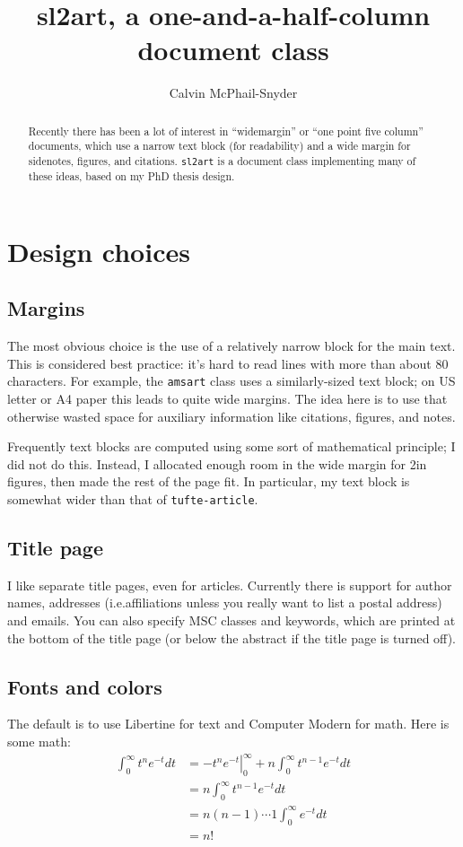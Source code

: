 \documentclass{sl2art}
\title{sl2art, a one-and-a-half-column document class}
\author{Calvin McPhail-Snyder}
\begin{document}
\begin{abstract}
  Recently there has been a lot of interest in ``widemargin'' or ``one point five column'' documents, which use a narrow text block (for readability) and a wide margin for sidenotes, figures, and citations.
\texttt{sl2art} is a document class implementing many of these ideas, based on my PhD thesis design.
\end{abstract}

\maketitle
\tableofcontents

\section{Design choices}

\subsection{Margins}
The most obvious choice is the use of a relatively narrow block for the main text.
This is considered best practice: it's hard to read lines with more than about 80 characters.
For example, the \texttt{amsart} class uses a similarly-sized text block; on US letter or A4 paper this leads to quite wide margins.
The idea here is to use that otherwise wasted space for auxiliary information like citations, figures, and notes.

Frequently text blocks are computed using some sort of mathematical principle; I did not do this.
Instead, I allocated enough room in the wide margin for 2in figures, then made the rest of the page fit.
In particular, my text block is somewhat wider than that of \texttt{tufte-article}.

\subsection{Title page}
I like separate title pages, even for articles.
Currently there is support for author names, addresses (i.e.\@ affiliations unless you really want to list a postal address) and emails.
You can also specify MSC classes and keywords, which are printed at the bottom of the title page (or below the abstract if the title page is turned off).

\subsection{Fonts and colors}
The default is to use Libertine for text and Computer Modern for math.
Here is some math:
\begin{align*}
  \int_{0}^{\infty} t^{n} e^{-t} dt
  &=
  \left.- t^{n} e^{-t} \right|_{0}^{\infty}
  +
  n \int_{0}^{\infty} t^{n-1} e^{-t} dt
  \\
  &=
  n \int_{0}^{\infty} t^{n-1} e^{-t} dt
  \\
  &= n(n-1) \cdots 1 \int_{0}^{\infty} e^{-t} dt
  \\
  &= n!
\end{align*}
\end{document}
